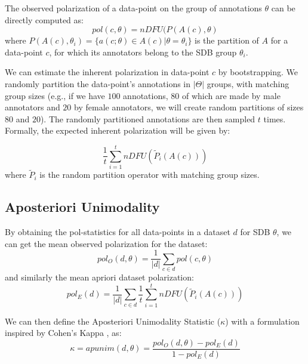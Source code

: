 \documentclass[twocolumn, 8pt]{article}
\begin{document}
The observed polarization of a data-point on the group of annotations $\theta$ can be directly computed as: 
 \begin{equation}
 	pol(c, \theta) = nDFU(P(A(c), \theta)
 \end{equation}
 \noindent where $P(A(c), \theta_i) = \{a(c; \theta) \in A(c) | \theta=\theta_i\}$ is the partition of $A$ for a data-point $c$, for which its annotators belong to the \ac{SDB} group $\theta_i$.
 
 We can estimate the inherent polarization in data-point $c$ by bootstrapping. We randomly partition the data-point's annotations in $\lvert \Theta \rvert$ groups, with matching group sizes (e.g., if we have $100$ annotations, $80$ of which are made by male annotators and $20$ by female annotators, we will create random partitions of sizes $80$ and $20$). The randomly partitioned annotations are then sampled $t$ times. Formally, the expected inherent polarization will be given by:
 
 \begin{equation}
 	\label{eq:pol_expected}
 	\frac{1}{t} \sum_{i=1}^t  \textit{nDFU}(\tilde{P}_i(A(c)))
 \end{equation}
 \noindent where $\tilde{P}_i$ is the random partition operator with matching group sizes.


\subsection{Aposteriori Unimodality}
\label{ssec:methodology:aposteriori}

By obtaining the pol-statistics for all data-points in a dataset $d$ for \ac{SDB} $\theta$, we can get the mean observed polarization for the dataset:
\begin{equation}
	pol_{O}(d, \theta) = \frac{1}{\lvert d \rvert} \sum_{c \in d} pol(c, \theta)
\end{equation} 
\noindent and similarly the mean apriori dataset polarization:
\begin{equation}
	pol_{E}(d) = \frac{1}{\lvert d \rvert} \sum_{c \in d} \frac{1}{t} \sum_{i=1}^t  \textit{nDFU}(\tilde{P}_i(A(c)))
\end{equation}

\noindent We can then define the Aposteriori Unimodality Statistic ($\kappa$) with a formulation inspired by Cohen's Kappa \cite{Cohen_1960}, as:
\begin{equation}
	\kappa = apunim(d, \theta) = \frac{pol_O(d, \theta) - pol_E(d)}{1 - pol_E(d)}
\end{equation}
\end{document}
